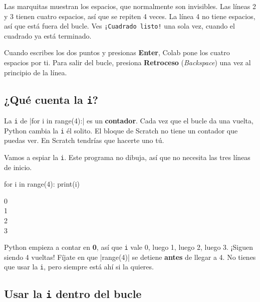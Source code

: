 Las marquitas \texttt{\textvisiblespace} muestran los espacios, que normalmente son invisibles. Las líneas 2 y 3 tienen cuatro espacios, así que se repiten 4 veces. La línea 4 no tiene espacios, así que está fuera del bucle. Ves \texttt{¡Cuadrado listo!} una sola vez, cuando el cuadrado ya está terminado.

\begin{think}
Cuando escribes los dos puntos y presionas \textbf{Enter}, Colab pone los cuatro espacios por ti. Para salir del bucle, presiona \textbf{Retroceso} (\textit{Backspace}) una vez al principio de la línea.
\end{think}

\subsection*{¿Qué cuenta la \texttt{i}?}

La \texttt{i} de \py|for i in range(4):| es un \textbf{contador}. Cada vez que el bucle da una vuelta, Python cambia la \texttt{i} él solito. El bloque  de Scratch no tiene un contador que puedas ver. En Scratch tendrías que hacerte uno tú.

Vamos a espiar la \texttt{i}. Este programa no dibuja, así que no necesita las tres líneas de inicio.

\begin{tcbraster}[raster columns=2, raster equal height=rows, raster column skip=12pt, raster valign=center]
\begin{code}
for i in range(4):
    print(i)
\end{code}
\begin{outputbox}
0\\
1\\
2\\
3
\end{outputbox}
\end{tcbraster}

Python empieza a contar en \textbf{0}, así que \texttt{i} vale 0, luego 1, luego 2, luego 3. ¡Siguen siendo 4 vueltas! Fíjate en que \py|range(4)| se detiene \textbf{antes} de llegar a 4. No tienes que usar la \texttt{i}, pero siempre está ahí si la quieres.

\subsection*{Usar la \texttt{i} dentro del bucle}


